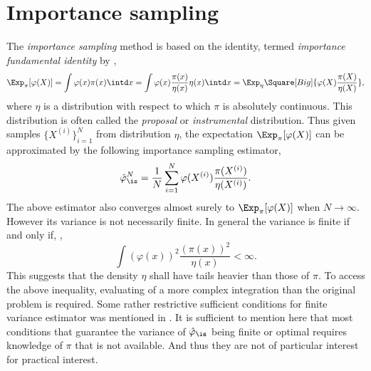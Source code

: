 \section{Importance sampling}
\label{sec:Importance sampling}

The \emph{importance sampling} method is based on the identity, termed
\emph{importance fundamental identity} by \cite{Robert:2004tn},
\begin{equation}
  \Exp_{\pi}[\varphi(X)]
  = \int\varphi(x)\pi(x)\intd x
  = \int\varphi(x)\frac{\pi(x)}{\eta(x)}\eta(x)\intd x
  = \Exp_{\eta}\Square[Big]{\varphi(X)\frac{\pi(X)}{\eta(X)}},
\end{equation}
where $\eta$ is a distribution with respect to which $\pi$ is absolutely
continuous. This distribution is often called the \emph{proposal} or
\emph{instrumental} distribution. Thus given \iid samples
$\{X^{(i)}\}_{i=1}^N$ from distribution $\eta$, the expectation
$\Exp_{\pi}[\varphi(X)]$ can be approximated by the following importance
sampling estimator,
\begin{equation}
  \hat\varphi_{\is}^N
  = \frac{1}{N}\sum_{i=1}^N\varphi(X^{(i)})\frac{\pi(X^{(i)})}{\eta(X^{(i)})}.
  \label{eq:is normalized}
\end{equation}
The above estimator also converges almost surely to $\Exp_{\pi}[\varphi(X)]$
when $N\to\infty$. However its variance is not necessarily finite. In general
the variance is finite if and only if,
\cite[][sec.~3.3.2]{Robert:2004tn},
\begin{equation}
  \int(\varphi(x))^2\frac{(\pi(x))^2}{\eta(x)} < \infty.
\end{equation}
This suggests that the density $\eta$ shall have tails heavier than those of
$\pi$. To access the above inequality, evaluating of a more complex
integration than the original problem is required. Some rather restrictive
sufficient conditions for finite variance estimator was mentioned in
\cite{Geweke:1989tm}. It is sufficient to mention here that most conditions
that guarantee the variance of $\hat\varphi_{\is}$ being finite
or optimal requires knowledge of $\pi$ that is not available. And thus they
are not of particular interest for practical interest.

